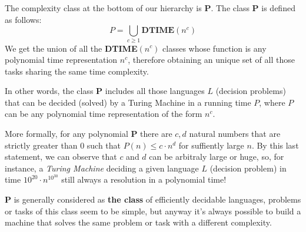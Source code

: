 The complexity class at the bottom of our hierarchy is \textbf{P}. The class \textbf{P} is defined as follows:
$$ P = \bigcup_{c \geq 1} \textbf{DTIME}(n^c)$$
We get the union of all the \textbf{DTIME}$(n^c)$ classes whose function is any polynomial time representation $n^c$, therefore obtaining an unique set of all 
those tasks sharing the same time complexity.

In other words, the class \textbf{P} includes all those languages $L$ (decision problems) that can be decided (solved) by a Turing Machine in a running time $P$,
where $P$ can be any polynomial time representation of the form $n^c$.

More formally, for any polynomial \textbf{P} there are $c,d$ natural numbers that are strictly greater than 0 such that $P(n) \leq c \cdot n^d$ for suffiently 
large $n$. By this last statement, we can observe that $c$ and $d$ can be arbitraly large or huge, so, for instance, a \textit{Turing Machine} deciding a given 
language $L$ (decision problem) in time $10^{20} \cdot n^{10^{30}}$ still always a resolution in a polynomial time!

\textbf{P} is generally considered as \textbf{the class} of efficiently decidable languages, problems or tasks of this class seem to be simple, but anyway
it's always possible to build a machine that solves the same problem or task with a different complexity.